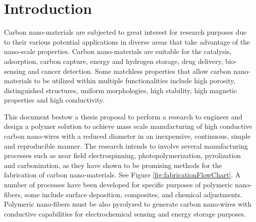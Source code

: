 
\chapter{Introduction} %

\label{Chapter:Introduction}


Carbon nano-materials are subjected to great interest for research purposes due to their various potential applications in diverse areas that take advantage of the nano-scale properties. \cite{Siddiqui2019} Carbon nano-materials are suitable for the catalysis, adsorption, carbon capture, energy and hydrogen storage, drug delivery, bio-sensing and cancer detection. \cite{Siddiqui2019} Some matchless properties that allow carbon nano-materials to be utilized within multiple functionalities include high porosity, distinguished structures, uniform morphologies, high stability, high magnetic properties and high conductivity. \cite{Siddiqui2019}

This document bestow a thesis proposal to perform a research to engineer and design a polymer solution to achieve mass scale manufacturing of high conductive carbon nano-wires with a reduced diameter in an inexpensive, continuous, simple and reproducible manner. The research intends to involve several manufacturing processes such as near field electrospinning, photopolymerization, pyrolization and carbonization, as they have shown to be promising methods for the fabrication of carbon nano-materials. \cite{Cardenas2017} See Figure \ref{fig:fabricationFlowChart}. A number of processes have been developed for specific purposes of polymeric nano-fibers, some include surface deposition, composites, and chemical adjustments. Polymeric nano-fibers must be also pyrolyzed to generate carbon nano-wires with conductive capabilities \cite{Madou2011} for electrochemical sensing and energy storage purposes.

